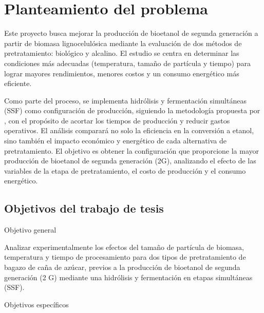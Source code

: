 \documentclass[12pt]{article}
\begin{document}
	\section{Planteamiento del problema}
 
Este proyecto busca mejorar la producción de bioetanol de segunda generación a partir de biomasa lignocelulósica mediante la evaluación de dos métodos de pretratamiento: biológico y alcalino. El estudio se centra en determinar las condiciones más adecuadas (temperatura, tamaño de partícula y tiempo) para lograr mayores rendimientos, menores costos y un consumo energético más eficiente.

Como parte del proceso, se implementa hidrólisis y fermentación simultáneas (SSF) como configuración de producción, siguiendo la metodología propuesta por \cite{Arturo2022evaluacion}, con el propósito de acortar los tiempos de producción y reducir gastos operativos. El análisis comparará no solo la eficiencia en la conversión a etanol, sino también el impacto económico y energético de cada alternativa de pretratamiento.
El objetivo es obtener la configuración que proporcione la mayor producción de bioetanol de segunda generación (2G), analizando el efecto de las variables de la etapa de pretratamiento, el costo de producción y el consumo energético.
		
		
		
		
	\subsection{Objetivos del trabajo de tesis}
	{\large Objetivo general}
	
	Analizar experimentalmente los efectos del tamaño de partícula de biomasa, temperatura y tiempo de procesamiento para dos tipos de pretratamiento de bagazo de caña de azúcar, previos a la producción de bioetanol de segunda generación (2 G) mediante una hidrólisis y fermentación en etapas simultáneas (SSF). \newline \newline
	
	{\large Objetivos específicos}
	
\end{document}
